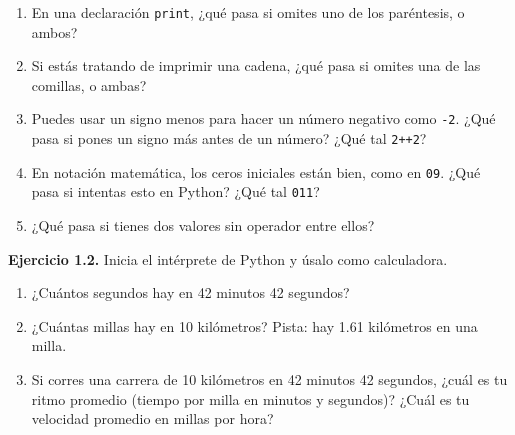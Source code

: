 \begin{enumerate}
\item En una declaración \texttt{print}, ¿qué pasa si omites uno de los paréntesis, o ambos?

\item Si estás tratando de imprimir una cadena, ¿qué pasa si omites una de las comillas, o ambas?

\item Puedes usar un signo menos para hacer un número negativo como \texttt{-2}. ¿Qué pasa si pones un signo más antes de un número? ¿Qué tal \texttt{2++2}?

\item En notación matemática, los ceros iniciales están bien, como en \texttt{09}. ¿Qué pasa si intentas esto en Python? ¿Qué tal \texttt{011}?

\item ¿Qué pasa si tienes dos valores sin operador entre ellos?
\end{enumerate}

\textbf{Ejercicio 1.2.} Inicia el intérprete de Python y úsalo como calculadora.

\begin{enumerate}
\item ¿Cuántos segundos hay en 42 minutos 42 segundos?

\item ¿Cuántas millas hay en 10 kilómetros? Pista: hay 1.61 kilómetros en una milla.

\item Si corres una carrera de 10 kilómetros en 42 minutos 42 segundos, ¿cuál es tu ritmo promedio (tiempo por milla en minutos y segundos)? ¿Cuál es tu velocidad promedio en millas por hora?
\end{enumerate}
